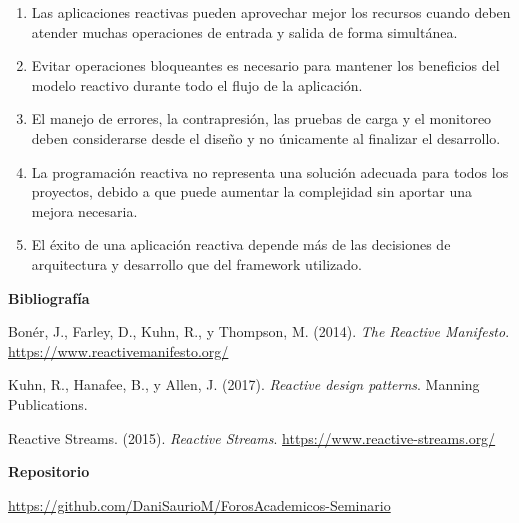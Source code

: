 \documentclass[12pt,letterpaper]{article}
\begin{document}
\begin{enumerate}[label=\arabic*., leftmargin=*]
    \item Las aplicaciones reactivas pueden aprovechar mejor los recursos cuando deben atender muchas operaciones de entrada y salida de forma simultánea.

    \item Evitar operaciones bloqueantes es necesario para mantener los beneficios del modelo reactivo durante todo el flujo de la aplicación.

    \item El manejo de errores, la contrapresión, las pruebas de carga y el monitoreo deben considerarse desde el diseño y no únicamente al finalizar el desarrollo.

    \item La programación reactiva no representa una solución adecuada para todos los proyectos, debido a que puede aumentar la complejidad sin aportar una mejora necesaria.

    \item El éxito de una aplicación reactiva depende más de las decisiones de arquitectura y desarrollo que del framework utilizado.
\end{enumerate}

\textbf{Bibliografía}

Bonér, J., Farley, D., Kuhn, R., y Thompson, M. (2014).
\textit{The Reactive Manifesto}.
\url{https://www.reactivemanifesto.org/}

Kuhn, R., Hanafee, B., y Allen, J. (2017).
\textit{Reactive design patterns}.
Manning Publications.

Reactive Streams. (2015).
\textit{Reactive Streams}.
\url{https://www.reactive-streams.org/}

\vspace{0.5cm}

\textbf{Repositorio}

\noindent\url{https://github.com/DaniSaurioM/ForosAcademicos-Seminario}
\end{document}
